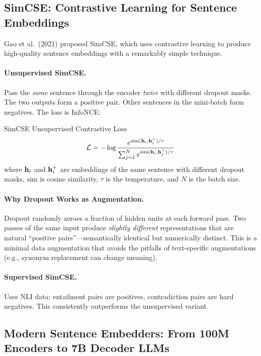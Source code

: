 \subsection{SimCSE: Contrastive Learning for Sentence Embeddings}
\label{subsec:simcse}

Gao et al.\ (2021) proposed SimCSE, which uses contrastive learning to produce
high-quality sentence embeddings with a remarkably simple technique.

\paragraph{Unsupervised SimCSE.}
Pass the \emph{same} sentence through the encoder \emph{twice} with different
dropout masks.  The two outputs form a positive pair.  Other sentences in the
mini-batch form negatives.  The loss is InfoNCE:

\begin{mathresult}{SimCSE Unsupervised Contrastive Loss}
\[
    \mathcal{L} = -\log \frac{e^{\text{sim}(\mathbf{h}_i, \mathbf{h}_i^+)/\tau}}
                       {\sum_{j=1}^{N} e^{\text{sim}(\mathbf{h}_i, \mathbf{h}_j^+)/\tau}}
\]
where $\mathbf{h}_i$ and $\mathbf{h}_i^+$ are embeddings of the same sentence with
different dropout masks, $\text{sim}$ is cosine similarity, $\tau$ is the
temperature, and $N$ is the batch size.
\end{mathresult}

\paragraph{Why Dropout Works as Augmentation.}
Dropout randomly zeroes a fraction of hidden units at each forward pass.  Two
passes of the same input produce \emph{slightly different} representations
that are natural ``positive pairs''---semantically identical but numerically
distinct.  This is a minimal data augmentation that avoids the pitfalls of
text-specific augmentations (e.g., synonym replacement can change meaning).

\paragraph{Supervised SimCSE.}
Uses NLI data: entailment pairs are positives, contradiction pairs are hard
negatives.  This consistently outperforms the unsupervised variant.

\subsection{Modern Sentence Embedders: From 100M Encoders to 7B Decoder LLMs}
\label{subsec:modern_embedders}

